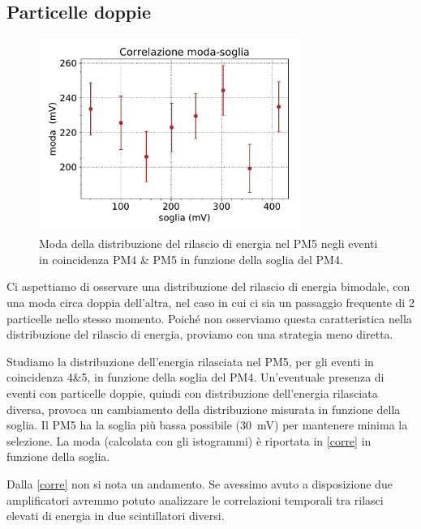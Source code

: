 \subsection{Particelle doppie}

\begin{figure}
	\centering
	\includegraphics[width=23em]{doppie}
	\caption{Moda della distribuzione del rilascio di energia nel PM5
	negli eventi in coincidenza PM4 \& PM5
	in funzione della soglia del PM4.}
	\label{corre}
\end{figure}

Ci aspettiamo di osservare una distribuzione del rilascio di energia bimodale,
con una moda circa doppia dell'altra,
nel caso in cui ci sia un passaggio frequente di 2 particelle nello stesso momento.
Poiché non osserviamo questa caratteristica nella distribuzione del rilascio di energia,
proviamo con una strategia meno diretta.

Studiamo la distribuzione dell'energia rilasciata nel PM5,
per gli eventi in coincidenza 4\&5,
in funzione della soglia del PM4.
Un'eventuale presenza di eventi con particelle doppie,
quindi con distribuzione dell'energia rilasciata diversa,
provoca un cambiamento della distribuzione misurata in funzione della soglia.
Il PM5 ha la soglia più bassa possibile (\SI{30}{mV}) per mantenere minima la selezione.
La moda (calcolata con gli istogrammi) è riportata in \autoref{corre} in funzione della soglia.

Dalla \autoref{corre} non si nota un andamento.
Se avessimo avuto a disposizione due amplificatori
avremmo potuto analizzare le correlazioni temporali tra rilasci elevati di energia in due scintillatori diversi.
